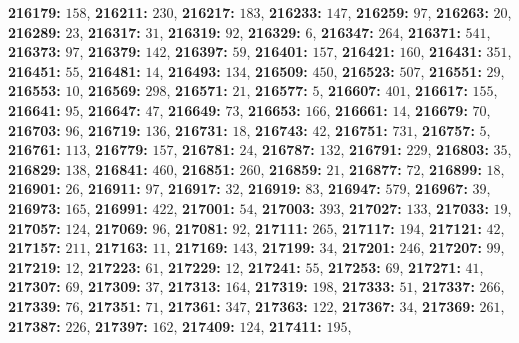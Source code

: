 \textsf{\bfseries 216179:} $158$, \textsf{\bfseries 216211:} $230$, \textsf{\bfseries 216217:} $183$, \textsf{\bfseries 216233:} $147$, \textsf{\bfseries 216259:} $97$, \textsf{\bfseries 216263:} $20$, \textsf{\bfseries 216289:} $23$, \textsf{\bfseries 216317:} $31$, \textsf{\bfseries 216319:} $92$, \textsf{\bfseries 216329:} $6$, \textsf{\bfseries 216347:} $264$, \textsf{\bfseries 216371:} $541$, \textsf{\bfseries 216373:} $97$, \textsf{\bfseries 216379:} $142$, \textsf{\bfseries 216397:} $59$, \textsf{\bfseries 216401:} $157$, \textsf{\bfseries 216421:} $160$, \textsf{\bfseries 216431:} $351$, \textsf{\bfseries 216451:} $55$, \textsf{\bfseries 216481:} $14$, \textsf{\bfseries 216493:} $134$, \textsf{\bfseries 216509:} $450$, \textsf{\bfseries 216523:} $507$, \textsf{\bfseries 216551:} $29$, \textsf{\bfseries 216553:} $10$, \textsf{\bfseries 216569:} $298$, \textsf{\bfseries 216571:} $21$, \textsf{\bfseries 216577:} $5$, \textsf{\bfseries 216607:} $401$, \textsf{\bfseries 216617:} $155$, \textsf{\bfseries 216641:} $95$, \textsf{\bfseries 216647:} $47$, \textsf{\bfseries 216649:} $73$, \textsf{\bfseries 216653:} $166$, \textsf{\bfseries 216661:} $14$, \textsf{\bfseries 216679:} $70$, \textsf{\bfseries 216703:} $96$, \textsf{\bfseries 216719:} $136$, \textsf{\bfseries 216731:} $18$, \textsf{\bfseries 216743:} $42$, \textsf{\bfseries 216751:} $731$, \textsf{\bfseries 216757:} $5$, \textsf{\bfseries 216761:} $113$, \textsf{\bfseries 216779:} $157$, \textsf{\bfseries 216781:} $24$, \textsf{\bfseries 216787:} $132$, \textsf{\bfseries 216791:} $229$, \textsf{\bfseries 216803:} $35$, \textsf{\bfseries 216829:} $138$, \textsf{\bfseries 216841:} $460$, \textsf{\bfseries 216851:} $260$, \textsf{\bfseries 216859:} $21$, \textsf{\bfseries 216877:} $72$, \textsf{\bfseries 216899:} $18$, \textsf{\bfseries 216901:} $26$, \textsf{\bfseries 216911:} $97$, \textsf{\bfseries 216917:} $32$, \textsf{\bfseries 216919:} $83$, \textsf{\bfseries 216947:} $579$, \textsf{\bfseries 216967:} $39$, \textsf{\bfseries 216973:} $165$, \textsf{\bfseries 216991:} $422$, \textsf{\bfseries 217001:} $54$, \textsf{\bfseries 217003:} $393$, \textsf{\bfseries 217027:} $133$, \textsf{\bfseries 217033:} $19$, \textsf{\bfseries 217057:} $124$, \textsf{\bfseries 217069:} $96$, \textsf{\bfseries 217081:} $92$, \textsf{\bfseries 217111:} $265$, \textsf{\bfseries 217117:} $194$, \textsf{\bfseries 217121:} $42$, \textsf{\bfseries 217157:} $211$, \textsf{\bfseries 217163:} $11$, \textsf{\bfseries 217169:} $143$, \textsf{\bfseries 217199:} $34$, \textsf{\bfseries 217201:} $246$, \textsf{\bfseries 217207:} $99$, \textsf{\bfseries 217219:} $12$, \textsf{\bfseries 217223:} $61$, \textsf{\bfseries 217229:} $12$, \textsf{\bfseries 217241:} $55$, \textsf{\bfseries 217253:} $69$, \textsf{\bfseries 217271:} $41$, \textsf{\bfseries 217307:} $69$, \textsf{\bfseries 217309:} $37$, \textsf{\bfseries 217313:} $164$, \textsf{\bfseries 217319:} $198$, \textsf{\bfseries 217333:} $51$, \textsf{\bfseries 217337:} $266$, \textsf{\bfseries 217339:} $76$, \textsf{\bfseries 217351:} $71$, \textsf{\bfseries 217361:} $347$, \textsf{\bfseries 217363:} $122$, \textsf{\bfseries 217367:} $34$, \textsf{\bfseries 217369:} $261$, \textsf{\bfseries 217387:} $226$, \textsf{\bfseries 217397:} $162$, \textsf{\bfseries 217409:} $124$, \textsf{\bfseries 217411:} $195$, 
